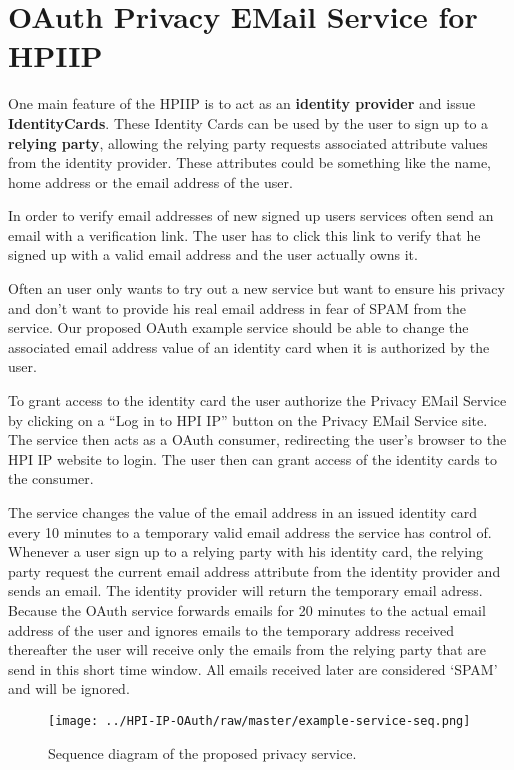 \section{OAuth Privacy EMail Service for HPIIP}

One main feature of the HPIIP is to act as an
\textbf{identity provider} and issue \textbf{IdentityCards}. These
Identity Cards can be used by the user to sign up to a
\textbf{relying party}, allowing the relying party requests
associated attribute values from the identity provider. These
attributes could be something like the name, home address or the
email address of the user.

In order to verify email addresses of new signed up users services
often send an email with a verification link. The user has to click
this link to verify that he signed up with a valid email address
and the user actually owns it.

Often an user only wants to try out a new service but want to
ensure his privacy and don't want to provide his real email address
in fear of SPAM from the service. Our proposed OAuth example
service should be able to change the associated email address value
of an identity card when it is authorized by the user.

To grant access to the identity card the user authorize the Privacy
EMail Service by clicking on a ``Log in to HPI IP'' button on the
Privacy EMail Service site. The service then acts as a OAuth
consumer, redirecting the user's browser to the HPI IP website to
login. The user then can grant access of the identity cards to the
consumer.

The service changes the value of the email address in an issued
identity card every 10 minutes to a temporary valid email address
the service has control of. Whenever a user sign up to a relying
party with his identity card, the relying party request the current
email address attribute from the identity provider and sends an
email. The identity provider will return the temporary email
adress. Because the OAuth service forwards emails for 20 minutes to
the actual email address of the user and ignores emails to the
temporary address received thereafter the user will receive only
the emails from the relying party that are send in this short time
window. All emails received later are considered `SPAM' and will be
ignored.

\begin{figure}
	\centering
	\texttt{[image: ../HPI-IP-OAuth/raw/master/example-service-seq.png]}
	\caption{Sequence diagram of the proposed privacy service.}  
\end{figure}


